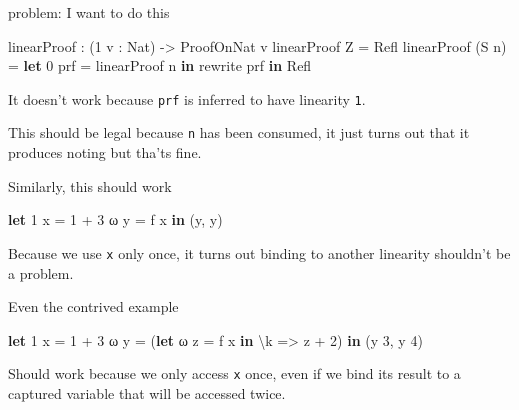 \documentclass[
]{article}
\newenvironment{Shaded}{}{}
\newcommand{\DataTypeTok}[1]{\textcolor[rgb]{0.56,0.13,0.00}{#1}}
\newcommand{\DecValTok}[1]{\textcolor[rgb]{0.25,0.63,0.44}{#1}}
\newcommand{\KeywordTok}[1]{\textcolor[rgb]{0.00,0.44,0.13}{\textbf{#1}}}
\newcommand{\NormalTok}[1]{#1}
\newcommand{\OperatorTok}[1]{\textcolor[rgb]{0.40,0.40,0.40}{#1}}
\newcommand{\OtherTok}[1]{\textcolor[rgb]{0.00,0.44,0.13}{#1}}
\begin{document}
problem: I want to do this

\begin{Shaded}
\begin{Highlighting}[]
\NormalTok{linearProof }\OperatorTok{:}\NormalTok{ (}\DecValTok{1}\NormalTok{ v }\OperatorTok{:} \DataTypeTok{Nat}\NormalTok{) }\OtherTok{{-}\textgreater{}} \DataTypeTok{ProofOnNat}\NormalTok{ v}
\NormalTok{linearProof }\DataTypeTok{Z} \OtherTok{=} \DataTypeTok{Refl} 
\NormalTok{linearProof (}\DataTypeTok{S}\NormalTok{ n) }\OtherTok{=} \KeywordTok{let} \DecValTok{0}\NormalTok{ prf }\OtherTok{=}\NormalTok{ linearProof n }\KeywordTok{in} 
\NormalTok{                        rewrite prf }\KeywordTok{in} \DataTypeTok{Refl}
\end{Highlighting}
\end{Shaded}

It doesn't work because \texttt{prf} is inferred to have linearity
\texttt{1}.

This should be legal because \texttt{n} has been consumed, it just turns
out that it produces noting but tha'ts fine.

Similarly, this should work

\begin{Shaded}
\begin{Highlighting}[]
\KeywordTok{let} \DecValTok{1}\NormalTok{ x }\OtherTok{=} \DecValTok{1} \OperatorTok{+} \DecValTok{3}
\NormalTok{    ω y }\OtherTok{=}\NormalTok{ f x }\KeywordTok{in}
\NormalTok{    (y, y)}
\end{Highlighting}
\end{Shaded}

Because we use \texttt{x} only once, it turns out binding to another
linearity shouldn't be a problem.

Even the contrived example

\begin{Shaded}
\begin{Highlighting}[]
\KeywordTok{let} \DecValTok{1}\NormalTok{ x }\OtherTok{=} \DecValTok{1} \OperatorTok{+} \DecValTok{3}
\NormalTok{    ω y }\OtherTok{=}\NormalTok{ (}\KeywordTok{let}\NormalTok{ ω z }\OtherTok{=}\NormalTok{ f x }\KeywordTok{in}\NormalTok{ \textbackslash{}k }\OtherTok{=\textgreater{}}\NormalTok{ z }\OperatorTok{+} \DecValTok{2}\NormalTok{) }\KeywordTok{in}
\NormalTok{    (y }\DecValTok{3}\NormalTok{, y }\DecValTok{4}\NormalTok{)}
\end{Highlighting}
\end{Shaded}

Should work because we only access \texttt{x} once, even if we bind its
result to a captured variable that will be accessed twice.
\end{document}
